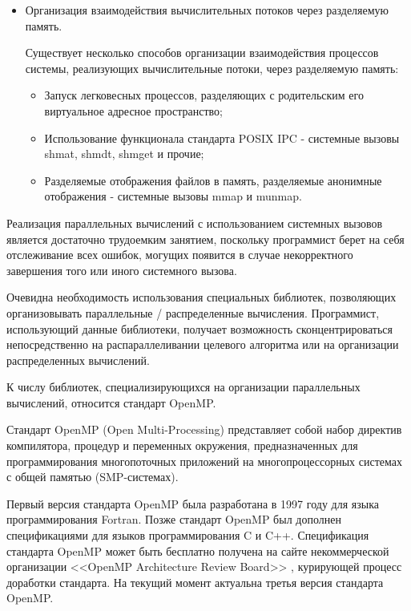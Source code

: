 \begin{itemize}
	\item Организация взаимодействия вычислительных потоков через разделяемую память.

	Существует несколько способов организации взаимодействия процессов системы, реализующих вычислительные потоки, через разделяемую память:

	\begin{itemize}

		\item Запуск легковесных процессов, разделяющих с родительским его виртуальное адресное пространство;
		\item Использование функционала стандарта POSIX IPC - системные вызовы shmat, shmdt, shmget и прочие;
		\item Разделяемые отображения файлов в память, разделяемые анонимные отображения - системные вызовы mmap и munmap.

	\end{itemize}

\end{itemize}

Реализация параллельных вычислений с использованием системных вызовов \gl является достаточно трудоемким занятием, поскольку программист берет на себя отслеживание всех ошибок, могущих появится в случае некорректного завершения того или иного системного вызова.

Очевидна необходимость использования специальных библиотек, позволяющих организовывать параллельные / распределенные вычисления. Программист, использующий данные библиотеки, получает возможность сконцентрироваться непосредственно на распараллеливании целевого алгоритма или на организации распределенных вычислений.

К числу библиотек, специализирующихся на организации параллельных вычислений, относится стандарт OpenMP.


Стандарт OpenMP (Open Multi-Processing) представляет собой набор директив компилятора, процедур и переменных окружения, предназначенных для программирования многопоточных приложений на многопроцессорных системах с общей памятью (SMP-системах).

Первый версия стандарта OpenMP была разработана в 1997 году для языка программирования Fortran. Позже стандарт OpenMP был дополнен спецификациями для языков программирования C и C++. Спецификация стандарта OpenMP может быть бесплатно получена на сайте некоммерческой организации <<OpenMP Architecture Review Board>> \cite{TODO}, курирующей процесс доработки стандарта. На текущий момент актуальна третья версия стандарта OpenMP.

